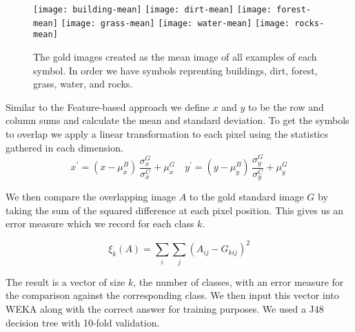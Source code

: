 
\begin{figure}[h]
\texttt{[image: building-mean]}
\texttt{[image: dirt-mean]}
\texttt{[image: forest-mean]}
\texttt{[image: grass-mean]}
\texttt{[image: water-mean]}
\texttt{[image: rocks-mean]}

\caption{The gold images created as the mean image of all examples of each symbol. In order we have symbols reprenting buildings, dirt, forest, grass, water, and rocks.}

\end{figure}

Similar to the Feature-based approach we define $x$ and $y$ to be the row and column sums and calculate the mean and standard deviation.
To get the symbols to overlap we apply a linear transformation to each pixel using the statistics gathered in each dimension.
\begin{equation} \label{eq:gold}
x^{\prime} = (x - \mu^{B}_{x}) \, \frac{\sigma^{G}_{x}}{\sigma^{C}_{x}} + \mu^{G}_{x} \quad
y^{\prime} = (y - \mu^{B}_{y}) \, \frac{\sigma^{G}_{y}}{\sigma^{C}_{y}} + \mu^{G}_{y}
\end{equation}

We then compare the overlapping image $A$ to the gold standard image $G$ by taking the sum of the squared difference at each pixel position.
This gives us an error measure which we record for each class $k$.

\[
\xi_{k}(A) = \sum_{i}\sum_{j}{(A_{ij} - G_{kij})^{2}}
\]

The result is a vector of size $k$, the number of classes, with an error measure for the comparison
against the corresponding class. We then input this vector into WEKA along with the correct answer
for training purposes. We used a J48 decision tree with 10-fold validation.
